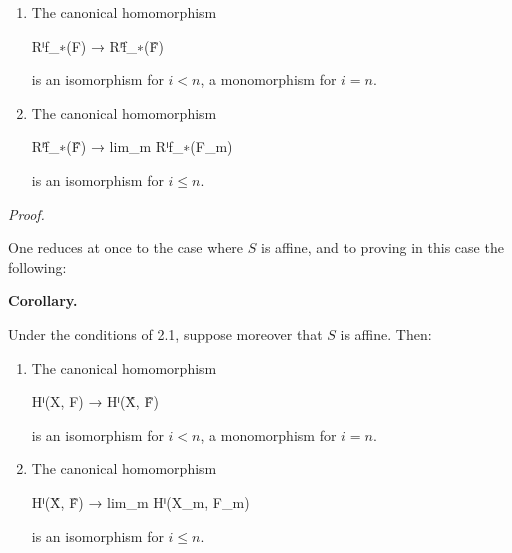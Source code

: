 \documentclass[
]{article}
\newenvironment{Shaded}{}{}
\newcommand{\NormalTok}[1]{#1}
\begin{document}
\begin{enumerate}
\def\labelenumi{\arabic{enumi}.}
\item
  The canonical homomorphism

\begin{Shaded}
\begin{Highlighting}[]
\NormalTok{Rⁱf\_∗(F) → Rⁱf̂\_∗(F̂)}
\end{Highlighting}
\end{Shaded}

  is an isomorphism for \(i < n\), a monomorphism for \(i = n\).
\item
  The canonical homomorphism

\begin{Shaded}
\begin{Highlighting}[]
\NormalTok{Rⁱf̂\_∗(F̂) → lim\_m Rⁱf\_∗(F\_m)}
\end{Highlighting}
\end{Shaded}

  is an isomorphism for \(i \leqslant n\).
\end{enumerate}

\emph{Proof.}

One reduces at once to the case where \(S\) is affine, and to proving in
this case the following:

\textbf{Corollary.}

Under the conditions of 2.1, suppose moreover that \(S\) is affine.
Then:

\begin{enumerate}
\def\labelenumi{\arabic{enumi}.}
\item
  The canonical homomorphism

\begin{Shaded}
\begin{Highlighting}[]
\NormalTok{Hⁱ(X, F) → Hⁱ(X̂, F̂)}
\end{Highlighting}
\end{Shaded}

  is an isomorphism for \(i < n\), a monomorphism for \(i = n\).
\item
  The canonical homomorphism

\begin{Shaded}
\begin{Highlighting}[]
\NormalTok{Hⁱ(X̂, F̂) → lim\_m Hⁱ(X\_m, F\_m)}
\end{Highlighting}
\end{Shaded}

  is an isomorphism for \(i \leqslant n\).
\end{enumerate}
\end{document}
